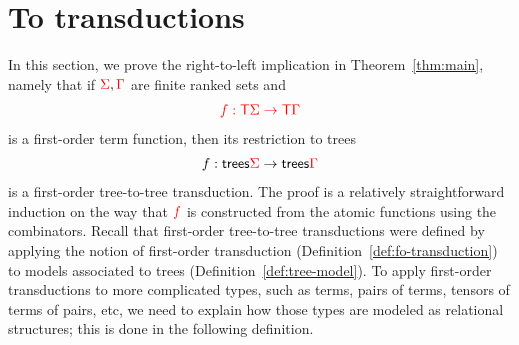 \newcommand{\Root}[1]{\mathsf{root}_{#1}}
\newcommand{\Port}[1]{\mathsf{port}_{#1}}
\newcommand{\Interface}[1]{\mathsf{Interface}_{#1}}
\section{To transductions}
\label{sec:to-transductions}
In this section, we prove the right-to-left implication in Theorem~\ref{thm:main}, namely that if ${\color{red}{\Sigma}},{\color{red}{\Gamma}}$ are finite ranked sets and 
\begin{align*}
    {\color{red}{f : {\color{red}{\mathsf T}}\Sigma \to {\color{red}{\mathsf T}}\Gamma}} 
\end{align*}
is a first-order term function, then its restriction to trees 
\begin{align*}
    f : \mathsf {trees} {\color{red}{\Sigma}} \to \mathsf {trees} {\color{red}{\Gamma}}
\end{align*}
is a first-order tree-to-tree transduction. The proof is a relatively straightforward induction on the way that ${\color{red}{f}}$ is constructed from the atomic functions using the combinators. Recall that first-order tree-to-tree transductions were defined by applying the notion of first-order transduction (Definition~\ref{def:fo-transduction}) to models associated to trees (Definition~\ref{def:tree-model}). To apply first-order transductions to more complicated types, such as terms, pairs of terms, tensors of terms of pairs, etc, we need to explain how those types are modeled as relational structures; this is done in the following definition. 




